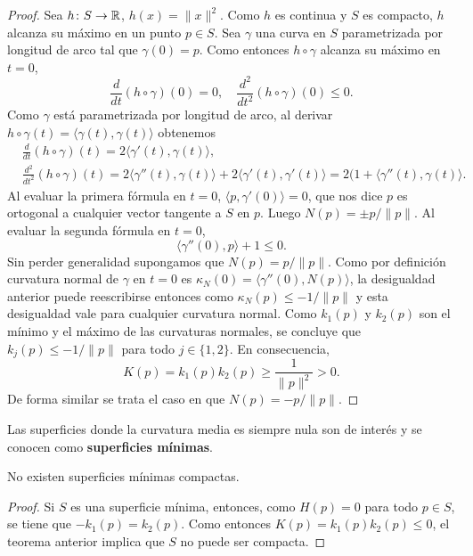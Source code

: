 \begin{proof}
	Sea $h\colon S\to\mathbb{R}$, $h(x)=\|x\|^2$. Como $h$ es continua y $S$ es
	compacto, $h$ alcanza su máximo en un punto $p\in S$. Sea $\gamma$ una
	curva en $S$ parametrizada por longitud de arco tal que $\gamma(0)=p$. Como
	entonces
	$h\circ\gamma$ alcanza su máximo en $t=0$, 
	\[
		\frac{d}{dt}(h\circ\gamma)(0)=0,\quad
		\frac{d^2}{dt^2}(h\circ\gamma)(0)\leq 0.
	\]
	Como
	$\gamma$ está parametrizada por longitud de arco, 
	al derivar $h\circ\gamma(t)=\langle \gamma(t),\gamma(t)\rangle$ obtenemos 
	\begin{align*}
		&\frac{d}{dt}(h\circ\gamma)(t)=2\langle \gamma'(t),\gamma(t)\rangle,\\
		&\frac{d^2}{dt^2}(h\circ\gamma)(t)=2\langle \gamma''(t),\gamma(t)\rangle+2\langle \gamma'(t),\gamma'(t)\rangle=2(1+\langle\gamma''(t),\gamma(t)\rangle.
	\end{align*}
	Al evaluar la primera fórmula en $t=0$,
	$\langle p,\gamma'(0)\rangle=0$, que nos dice $p$ es ortogonal a cualquier vector tangente a
	$S$ en $p$. Luego $N(p)=\pm p/\|p\|$. Al evaluar la segunda fórmula en $t=0$,
	\[
		\langle \gamma''(0),p\rangle+1\leq 0.
	\]
	Sin perder generalidad supongamos que $N(p)=p/\|p\|$. Como por definición 
	curvatura normal de $\gamma$ en $t=0$ es 
	$\kappa_N(0)=\langle\gamma''(0),N(p)\rangle$, 
	la desigualdad anterior puede reescribirse
	entonces como $\kappa_N(p)\leq -1/\|p\|$ y esta desigualdad vale para cualquier curvatura normal. 
	Como $k_1(p)$ y $k_2(p)$ son el
	mínimo y el máximo de las curvaturas normales, se concluye que 
	$k_j(p)\leq-1/\|p\|$ para todo $j\in\{1,2\}$. En consecuencia, 
	\[
		K(p)=k_1(p)k_2(p)\geq\frac{1}{\|p\|^2}>0.
	\]
	De forma similar se trata el caso en que $N(p)=-p/\|p\|$.
\end{proof}

Las superficies donde la curvatura media es siempre nula son de interés 
y se conocen como \textbf{superficies mínimas}. 

\begin{corollary}
	No existen superficies mínimas compactas.
\end{corollary}

\begin{proof}
	Si $S$ es una superficie mínima, entonces, como $H(p)=0$ para todo $p\in
	S$, se tiene que $-k_1(p)=k_2(p)$. Como entonces $K(p)=k_1(p)k_2(p)\leq 0$, 
	el teorema anterior implica que $S$ no puede ser compacta.
\end{proof}


